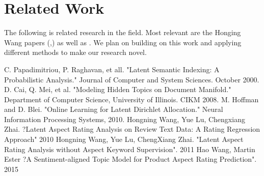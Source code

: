 \documentclass[preprint,10pt]{elsarticle}
\begin{document}
\section{Related Work}
The following is related research in the field. Most relevant are the Honging Wang papers (\cite{LARA},\cite{LARA2}) as well as \cite{lex}. We plan on building on this work and applying different methods to make our research novel.
\begin{thebibliography}{2}
  C. Papadimitriou, P. Raghavan, et all. "Latent Semantic Indexing: A Probabilistic Analysis." Journal of Computer and System Sciences. October 2000.
 D. Cai, Q. Mei, et al. "Modeling Hidden Topics on Document Manifold." Department of Computer Science, University of Illinois. CIKM 2008.
M. Hoffman and D. Blei. "Online Learning for Latent Dirichlet Allocation." Neural Information Processing Systems, 2010. 
Hongning Wang, Yue Lu, Chengxiang Zhai. ?Latent Aspect Rating Analysis on Review Text Data: A Rating Regression Approach" 2010
Hongning Wang, Yue Lu, ChengXiang Zhai. "Latent Aspect Rating Analysis without Aspect Keyword Supervision". 2011
Hao Wang, Martin Ester ?A Sentiment-aligned Topic Model for Product Aspect Rating Prediction". 2015

\end{thebibliography}
\end{document}
